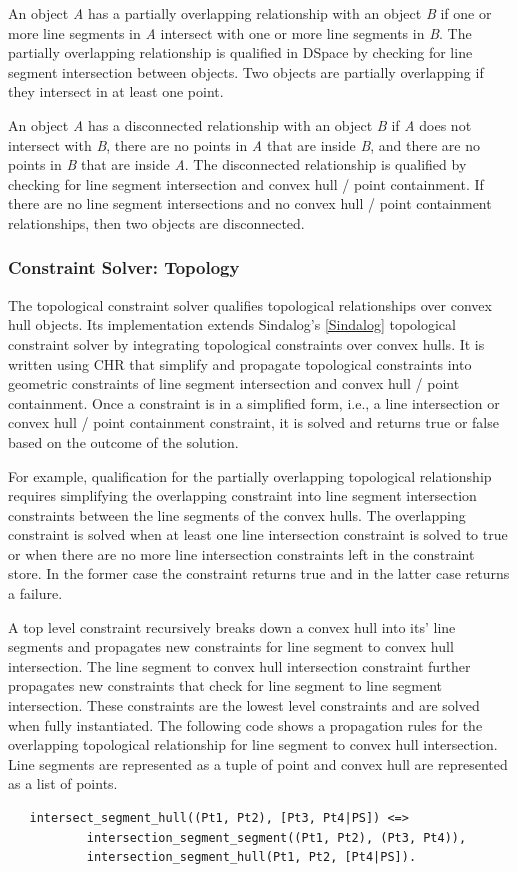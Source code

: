 \documentclass[12pt]{ucthesis}
\begin{document}
An object \emph{A} has a partially overlapping relationship with an object \emph{B} if one or more line segments in \emph{A} intersect with one or more line segments in \emph{B}. The partially overlapping relationship is qualified in DSpace by checking for line segment intersection between objects. Two objects are partially overlapping if they intersect in at least one point.  

An object \emph{A} has a disconnected relationship with an object \emph{B} if \emph{A} does not intersect with \emph{B}, there are no points in \emph{A} that are inside \emph{B}, and there are no points in \emph{B} that are inside \emph{A}. The disconnected relationship is qualified by checking for line segment intersection and convex hull / point containment. If there are no line segment intersections and no convex hull / point containment relationships, then two objects are disconnected.  

\subsubsection{Constraint Solver: Topology}
The topological constraint solver qualifies topological relationships over convex hull objects. Its implementation extends Sindalog's \ref{Sindalog} topological constraint solver by integrating topological constraints over convex hulls. It is written using CHR that simplify and propagate topological constraints into geometric constraints of line segment intersection and convex hull / point containment. Once a constraint is in a simplified form, i.e., a line intersection or convex hull / point containment constraint, it is solved and returns true or false based on the outcome of the solution.   

For example, qualification for the partially overlapping topological relationship requires simplifying the overlapping constraint into line segment intersection constraints between the line segments of the convex hulls. The overlapping constraint is solved when at least one line intersection constraint is solved to true or when there are no more line intersection constraints left in the constraint store. In the former case the constraint returns true and in the latter case returns a failure. 

A top level constraint recursively breaks down a convex hull into its' line segments and propagates new constraints for line segment to convex hull intersection. The line segment to convex hull intersection constraint further propagates new constraints that check for line segment to line segment intersection. These constraints are the lowest level constraints and are solved when fully instantiated. The following code shows a propagation rules for the overlapping topological relationship for line segment to convex hull intersection. Line segments are represented as a tuple of point and convex hull are represented as a list of points.   
\begin{verbatim}
   intersect_segment_hull((Pt1, Pt2), [Pt3, Pt4|PS]) <=>
           intersection_segment_segment((Pt1, Pt2), (Pt3, Pt4)),
           intersection_segment_hull(Pt1, Pt2, [Pt4|PS]).
\end{verbatim}
\end{document}
